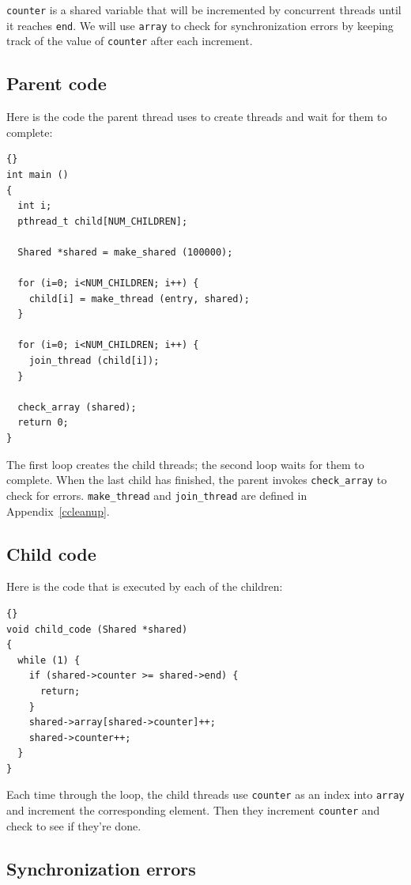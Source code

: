 \documentclass{book}
\begin{document}
{\tt counter} is a shared variable that will be incremented by
concurrent threads until it reaches {\tt end}.  We will use
{\tt array} to check for synchronization errors by keeping track
of the value of {\tt counter} after each increment.

\subsection{Parent code}

Here is the code the parent thread uses to create threads
and wait for them to complete:

\begin{lstlisting}[caption={}]{}
int main ()
{
  int i;
  pthread_t child[NUM_CHILDREN];

  Shared *shared = make_shared (100000);

  for (i=0; i<NUM_CHILDREN; i++) {
    child[i] = make_thread (entry, shared);
  }

  for (i=0; i<NUM_CHILDREN; i++) {
    join_thread (child[i]);
  }

  check_array (shared);
  return 0;
}
\end{lstlisting}

The first loop creates the child threads; the second loop waits
for them to complete.  When the last child has finished, the parent
invokes {\tt check\_array} to check for errors.
{\tt make\_thread} and {\tt join\_thread} are defined in
Appendix~\ref{ccleanup}.

\subsection{Child code}

Here is the code that is executed by each of the children:

\begin{lstlisting}[caption={}]{}
void child_code (Shared *shared)
{
  while (1) {
    if (shared->counter >= shared->end) {
      return;
    }
    shared->array[shared->counter]++;
    shared->counter++;
  }
}
\end{lstlisting}

Each time through the loop, the child threads use {\tt counter}
as an index into {\tt array} and increment the corresponding element.
Then they increment {\tt counter} and check to see if they're done.

\subsection{Synchronization errors}
\end{document}
